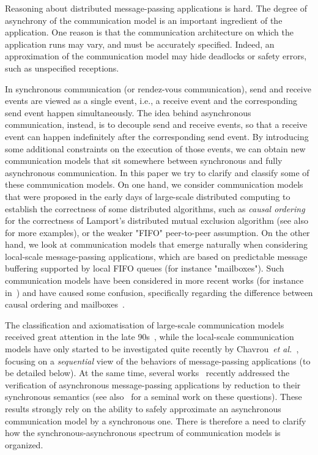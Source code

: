 
Reasoning about distributed message-passing applications is  hard. The degree of asynchrony
of the communication model is  an important ingredient of the application.
One reason
is that the communication architecture on which the application runs may vary, and must be accurately specified. 
Indeed, an approximation of the communication model may hide deadlocks or safety errors,
such as unspecified receptions.

In synchronous communication (or rendez-vous communication), send and receive events are viewed as
a single event, i.e., a receive event and the corresponding send event happen simultaneously. The idea behind asynchronous communication, instead, is to decouple send and receive events, so that a receive event can happen indefinitely after the corresponding send event. By introducing some additional constraints on the execution of those events, we can obtain new communication models that sit somewhere between synchronous and fully asynchronous communication.
In this paper we try to clarify and classify some of these communication models.
On  one hand, we consider communication models that were proposed in the early days of large-scale distributed computing to establish the correctness of some distributed algorithms, such as \emph{causal ordering}~\cite{Lamport78} for the correctness of Lamport's distributed mutual exclusion algorithm (see also~\cite{Renesse93} for more examples), or the weaker "FIFO" peer-to-peer assumption. On the other hand, we look at communication models that emerge
naturally when considering local-scale message-passing applications, which are based on predictable
message buffering supported by local FIFO queues (for instance "mailboxes"). Such communication models have
been considered in more recent works (for instance in~\cite{DBLP:journals/tcs/BasuB16}) and have caused
some confusion, specifically regarding the difference between causal ordering and mailboxes~\cite{DBLP:conf/cav/BouajjaniEJQ18,DBLP:conf/fossacs/GiustoLL20}.

The classification and axiomatisation of large-scale communication models received great attention in the late 90s~\cite{DBLP:journals/dc/Charron-BostMT96}, while the local-scale communication models have only started to be investigated quite recently by Chavrou~\emph{et al.}~\cite{DBLP:journals/fac/ChevrouHQ16}, focusing on a \emph{sequential} view of the behaviors of message-passing
applications (to be detailed below).
At the same time, several works~\cite{KraglQH18,GleissenthallKB19,DBLP:conf/cav/BouajjaniEJQ18,DBLP:conf/cav/LangeY19} recently addressed the verification of
asynchronous message-passing applications by reduction to their synchronous semantics (see also~\cite{Lipton75} for a seminal work on these questions). These results strongly rely on the ability to safely approximate an asynchronous communication model by a synchronous one. There is therefore a need to clarify how the synchronous-asynchronous spectrum of communication models is organized.

